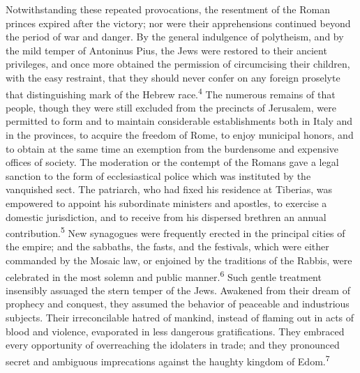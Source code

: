 
Notwithstanding these repeated provocations, the resentment of
the Roman princes expired after the victory; nor were their
apprehensions continued beyond the period of war and danger. By
the general indulgence of polytheism, and by the mild temper of
Antoninus Pius, the Jews were restored to their ancient
privileges, and once more obtained the permission of circumcising
their children, with the easy restraint, that they should never
confer on any foreign proselyte that distinguishing mark of the
Hebrew race.\textsuperscript{4} The numerous remains of that people, though they
were still excluded from the precincts of Jerusalem, were
permitted to form and to maintain considerable establishments
both in Italy and in the provinces, to acquire the freedom of
Rome, to enjoy municipal honors, and to obtain at the same time
an exemption from the burdensome and expensive offices of
society. The moderation or the contempt of the Romans gave a
legal sanction to the form of ecclesiastical police which was
instituted by the vanquished sect. The patriarch, who had fixed
his residence at Tiberias, was empowered to appoint his
subordinate ministers and apostles, to exercise a domestic
jurisdiction, and to receive from his dispersed brethren an
annual contribution.\textsuperscript{5} New synagogues were frequently erected in
the principal cities of the empire; and the sabbaths, the fasts,
and the festivals, which were either commanded by the Mosaic law,
or enjoined by the traditions of the Rabbis, were celebrated in
the most solemn and public manner.\textsuperscript{6} Such gentle treatment
insensibly assuaged the stern temper of the Jews. Awakened from
their dream of prophecy and conquest, they assumed the behavior
of peaceable and industrious subjects. Their irreconcilable
hatred of mankind, instead of flaming out in acts of blood and
violence, evaporated in less dangerous gratifications. They
embraced every opportunity of overreaching the idolaters in
trade; and they pronounced secret and ambiguous imprecations
against the haughty kingdom of Edom.\textsuperscript{7}


